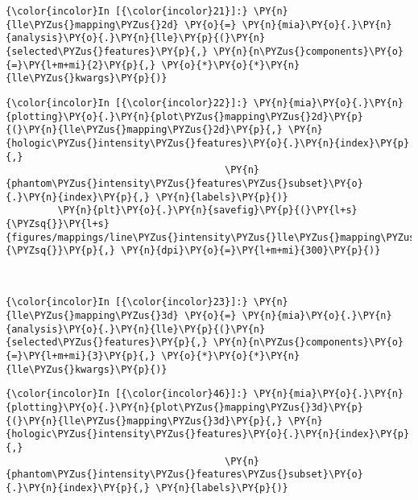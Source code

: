     \begin{Verbatim}[commandchars=\\\{\}]
{\color{incolor}In [{\color{incolor}21}]:} \PY{n}{lle\PYZus{}mapping\PYZus{}2d} \PY{o}{=} \PY{n}{mia}\PY{o}{.}\PY{n}{analysis}\PY{o}{.}\PY{n}{lle}\PY{p}{(}\PY{n}{selected\PYZus{}features}\PY{p}{,} \PY{n}{n\PYZus{}components}\PY{o}{=}\PY{l+m+mi}{2}\PY{p}{,} \PY{o}{*}\PY{o}{*}\PY{n}{lle\PYZus{}kwargs}\PY{p}{)}
\end{Verbatim}

    \begin{Verbatim}[commandchars=\\\{\}]
{\color{incolor}In [{\color{incolor}22}]:} \PY{n}{mia}\PY{o}{.}\PY{n}{plotting}\PY{o}{.}\PY{n}{plot\PYZus{}mapping\PYZus{}2d}\PY{p}{(}\PY{n}{lle\PYZus{}mapping\PYZus{}2d}\PY{p}{,} \PY{n}{hologic\PYZus{}intensity\PYZus{}features}\PY{o}{.}\PY{n}{index}\PY{p}{,}
                                      \PY{n}{phantom\PYZus{}intensity\PYZus{}features\PYZus{}subset}\PY{o}{.}\PY{n}{index}\PY{p}{,} \PY{n}{labels}\PY{p}{)}
         \PY{n}{plt}\PY{o}{.}\PY{n}{savefig}\PY{p}{(}\PY{l+s}{\PYZsq{}}\PY{l+s}{figures/mappings/line\PYZus{}intensity\PYZus{}lle\PYZus{}mapping\PYZus{}2d.png}\PY{l+s}{\PYZsq{}}\PY{p}{,} \PY{n}{dpi}\PY{o}{=}\PY{l+m+mi}{300}\PY{p}{)}
\end{Verbatim}

    \begin{center}
    \end{center}
    { \hspace*{\fill} \\}

    \begin{Verbatim}[commandchars=\\\{\}]
{\color{incolor}In [{\color{incolor}23}]:} \PY{n}{lle\PYZus{}mapping\PYZus{}3d} \PY{o}{=} \PY{n}{mia}\PY{o}{.}\PY{n}{analysis}\PY{o}{.}\PY{n}{lle}\PY{p}{(}\PY{n}{selected\PYZus{}features}\PY{p}{,} \PY{n}{n\PYZus{}components}\PY{o}{=}\PY{l+m+mi}{3}\PY{p}{,} \PY{o}{*}\PY{o}{*}\PY{n}{lle\PYZus{}kwargs}\PY{p}{)}
\end{Verbatim}

    \begin{Verbatim}[commandchars=\\\{\}]
{\color{incolor}In [{\color{incolor}46}]:} \PY{n}{mia}\PY{o}{.}\PY{n}{plotting}\PY{o}{.}\PY{n}{plot\PYZus{}mapping\PYZus{}3d}\PY{p}{(}\PY{n}{lle\PYZus{}mapping\PYZus{}3d}\PY{p}{,} \PY{n}{hologic\PYZus{}intensity\PYZus{}features}\PY{o}{.}\PY{n}{index}\PY{p}{,}
                                      \PY{n}{phantom\PYZus{}intensity\PYZus{}features\PYZus{}subset}\PY{o}{.}\PY{n}{index}\PY{p}{,} \PY{n}{labels}\PY{p}{)}
\end{Verbatim}

